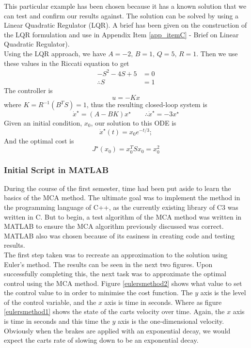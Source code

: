 \documentclass[11pt,draftd]{article}
\begin{document}
This particular example has been chosen because it has a known solution that we can test and confirm our results against. The solution can be solved by using a Linear Quadratic Regulator (LQR). A brief has been given on the construction of the LQR formulation and use in Appendix Item \ref{app_itemC} - Brief on Linear Quadratic Regulator). \\

Using the LQR approach, we have $ A = -2,\, B = 1,\, Q = 5,\, R = 1 $. Then we use these values in the Riccati equation to get
\begin{align*}
	-S^{2}-4S + 5 &= 0 \\
	\therefore S &= 1
\end{align*}
The controller is 
\begin{equation*}
	u = -Kx
\end{equation*}
where $ K = R^{-1}(B^{T}S) = 1 $, thus the resulting closed-loop system is
\begin{equation*}
	\dot{x}^{\star} = (A - BK) x^{\star}  \qquad \therefore \dot{x}^{\star} = -3x^{\star}
\end{equation*}
Given an initial condition, $ x_0 $, our solution to this ODE is
\begin{equation*}\label{key}
	\dot{x}^{\star}(t) = x_{0}e^{-t/3};
\end{equation*}
And the optimal cost is 
\begin{equation*}
	J^{\star}(x_0) = x_{0}^{T}Sx_{0}=x_{0}^{2}
\end{equation*}
\[\]

\subsubsection{Initial Script in MATLAB}
During the course of the first semester, time had been put aside to learn the basics of the MCA method. The ultimate goal was to implement the method in the programming language of C++, as the currently existing library of C3 was written in C. But to begin, a test algorithm of the MCA method was written in MATLAB to ensure the MCA algorithm previously discussed was correct. MATLAB also was chosen because of its easiness in creating code and testing results. \\

The first step taken was to recreate an approximation to the solution using Euler's method. The results can be seen in the next two figures. Upon successfully completing this, the next task was to approximate the optimal control using the MCA method. Figure \ref{eulersmethod2} shows what value to set the control value to in order to minimise the cost function. The $ y $ axis is the level of the control variable, and the $ x $ axis is time in seconds. Where as figure \ref{eulersmethod1} shows the state of the carts velocity over time. Again, the $ x $ axis is time in seconds and this time the $ y $ axis is the one-dimensional velocity. Obviously when the brakes are applied with an exponential decay, we would expect the carts rate of slowing down to be an exponential decay. 
\end{document}
